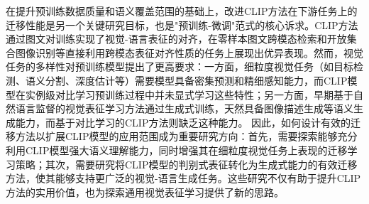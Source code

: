 
在提升预训练数据质量和语义覆盖范围的基础上，改进CLIP方法在下游任务上的迁移性能是另一个关键研究目标，也是"预训练-微调"范式的核心诉求。CLIP方法通过图文对训练实现了视觉-语言表征的对齐，在零样本图文跨模态检索和开放集合图像识别等直接利用跨模态表征对齐性质的任务上展现出优异表现。然而，视觉任务的多样性对预训练模型提出了更高要求：一方面，细粒度视觉任务（如目标检测、语义分割、深度估计等）需要模型具备密集预测和精细感知能力，而CLIP模型在实例级对比学习预训练过程中并未显式学习这些特性；另一方面，早期基于自然语言监督的视觉表征学习方法\cite{desai2021virtex}通过生成式训练，天然具备图像描述生成等语义生成能力，而基于对比学习的CLIP方法则缺乏这种能力。
因此，如何设计有效的迁移方法以扩展CLIP模型的应用范围成为重要研究方向：首先，需要探索能够充分利用CLIP模型强大语义理解能力，同时增强其在细粒度视觉任务上表现的迁移学习策略；其次，需要研究将CLIP模型的判别式表征转化为生成式能力的有效迁移方法，使其能够支持更广泛的视觉-语言生成任务。这些研究不仅有助于提升CLIP方法的实用价值，也为探索通用视觉表征学习提供了新的思路。




